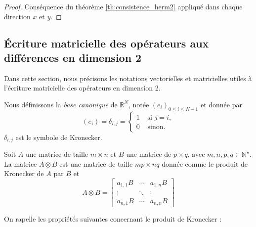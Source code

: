 \begin{proof}
Conséquence du théorème \ref{th:consistence_herm2} appliqué dans chaque direction $x$ et $y$.
\end{proof}

























\subsection{Écriture matricielle des opérateurs aux différences en dimension 2}

Dans cette section, nous précisons les notations vectorielles et matricielles utiles à l'écriture matricielle des opérateurs en dimension 2.

Nous définissons la \textit{base canonique} de $\mathbb{R}^N$, notée $\left(e_i \right)_{0 \leq i \leq N-1}$ et donnée par 
\begin{equation}
\left( e_i \right) = \delta_{i,j} = \left\lbrace
\begin{array}{rl}
1 & \text{ si } j=i,\\
0 & \text{ sinon.}
\end{array}
\right.
\end{equation}
$\delta_{i,j}$ est le symbole de Kronecker.

\begin{definition}
Soit $A$ une matrice de taille $m \times n$ et $B$ une matrice de $p \times q$, avec $m, n, p, q \in \mathbb{N}^{\star}$. La matrice $A \otimes B$ est une matrice de taille $mp \times nq$ donnée comme le produit de Kronecker de $A$ par $B$ et 
\begin{equation}
A \otimes B = 
\begin{bmatrix}
a_{1,1}B & \cdots & a_{1,n}B \\ 
\vdots & \ddots & \vdots \\ 
a_{n,1}B & \cdots & a_{n,n}B
\end{bmatrix} 
\end{equation}
\end{definition}
On rapelle les propriétés suivantes concernant le produit de Kronecker :

